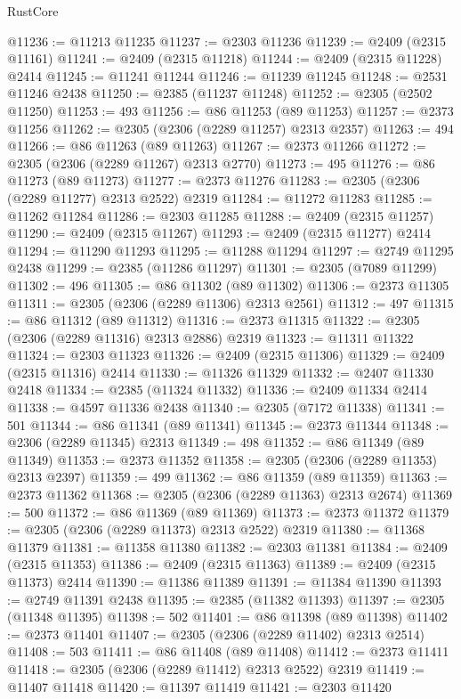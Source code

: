 \begin{lexlean}{RustCore}
\begin{coremodule}
@11236 := @11213 @11235
@11237 := @2303 @11236
@11239 := @2409 (@2315 @11161)
@11241 := @2409 (@2315 @11218)
@11244 := @2409 (@2315 @11228) @2414
@11245 := @11241 @11244
@11246 := @11239 @11245
@11248 := @2531 @11246 @2438
@11250 := @2385 (@11237 @11248)
@11252 := @2305 (@2502 @11250)
@11253 := 493
@11256 := @86 @11253 (@89 @11253)
@11257 := @2373 @11256
@11262 := @2305 (@2306 (@2289 @11257) @2313 @2357)
@11263 := 494
@11266 := @86 @11263 (@89 @11263)
@11267 := @2373 @11266
@11272 := @2305 (@2306 (@2289 @11267) @2313 @2770)
@11273 := 495
@11276 := @86 @11273 (@89 @11273)
@11277 := @2373 @11276
@11283 := @2305 (@2306 (@2289 @11277) @2313 @2522) @2319
@11284 := @11272 @11283
@11285 := @11262 @11284
@11286 := @2303 @11285
@11288 := @2409 (@2315 @11257)
@11290 := @2409 (@2315 @11267)
@11293 := @2409 (@2315 @11277) @2414
@11294 := @11290 @11293
@11295 := @11288 @11294
@11297 := @2749 @11295 @2438
@11299 := @2385 (@11286 @11297)
@11301 := @2305 (@7089 @11299)
@11302 := 496
@11305 := @86 @11302 (@89 @11302)
@11306 := @2373 @11305
@11311 := @2305 (@2306 (@2289 @11306) @2313 @2561)
@11312 := 497
@11315 := @86 @11312 (@89 @11312)
@11316 := @2373 @11315
@11322 := @2305 (@2306 (@2289 @11316) @2313 @2886) @2319
@11323 := @11311 @11322
@11324 := @2303 @11323
@11326 := @2409 (@2315 @11306)
@11329 := @2409 (@2315 @11316) @2414
@11330 := @11326 @11329
@11332 := @2407 @11330 @2418
@11334 := @2385 (@11324 @11332)
@11336 := @2409 @11334 @2414
@11338 := @4597 @11336 @2438
@11340 := @2305 (@7172 @11338)
@11341 := 501
@11344 := @86 @11341 (@89 @11341)
@11345 := @2373 @11344
@11348 := @2306 (@2289 @11345) @2313
@11349 := 498
@11352 := @86 @11349 (@89 @11349)
@11353 := @2373 @11352
@11358 := @2305 (@2306 (@2289 @11353) @2313 @2397)
@11359 := 499
@11362 := @86 @11359 (@89 @11359)
@11363 := @2373 @11362
@11368 := @2305 (@2306 (@2289 @11363) @2313 @2674)
@11369 := 500
@11372 := @86 @11369 (@89 @11369)
@11373 := @2373 @11372
@11379 := @2305 (@2306 (@2289 @11373) @2313 @2522) @2319
@11380 := @11368 @11379
@11381 := @11358 @11380
@11382 := @2303 @11381
@11384 := @2409 (@2315 @11353)
@11386 := @2409 (@2315 @11363)
@11389 := @2409 (@2315 @11373) @2414
@11390 := @11386 @11389
@11391 := @11384 @11390
@11393 := @2749 @11391 @2438
@11395 := @2385 (@11382 @11393)
@11397 := @2305 (@11348 @11395)
@11398 := 502
@11401 := @86 @11398 (@89 @11398)
@11402 := @2373 @11401
@11407 := @2305 (@2306 (@2289 @11402) @2313 @2514)
@11408 := 503
@11411 := @86 @11408 (@89 @11408)
@11412 := @2373 @11411
@11418 := @2305 (@2306 (@2289 @11412) @2313 @2522) @2319
@11419 := @11407 @11418
@11420 := @11397 @11419
@11421 := @2303 @11420

\end{coremodule}
\end{lexlean}
